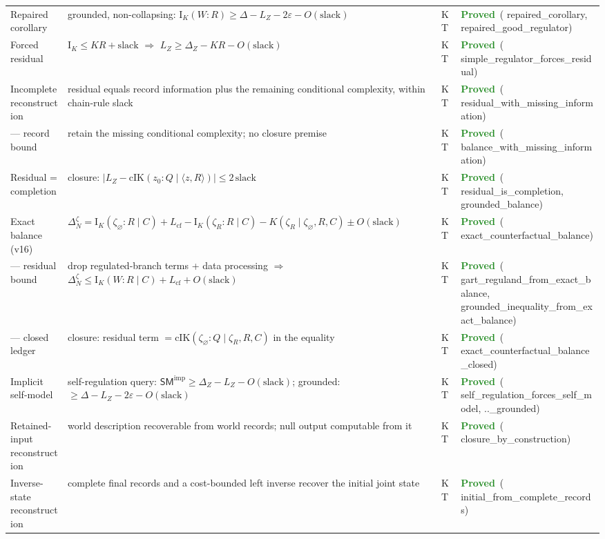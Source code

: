 \documentclass[11pt,a4paper]{article}
\newcommand{\lean}[1]{{\ttfamily\small
  \let\leanunderscore\_\def\_{\leanunderscore\allowbreak}#1}}
\newcommand{\Ik}{\mathrm{I}_K}
\newcommand{\stproved}{\textcolor{ForestGreen}{\textbf{Proved}}}
\begin{document}
{\begin{longtable}{@{}p{2.1cm}p{6.6cm}p{1.0cm}p{2.6cm}@{}}
Repaired corollary & grounded, non-collapsing: $\Ik(W{:}R)\ge\Delta-L_Z-2\varepsilon-O(\mathrm{slack})$ & KT &
  \stproved\ (\lean{repaired\_corollary}, \lean{repaired\_good\_regulator}) \\
Forced residual & $\Ik\le K R+\mathrm{slack}$ $\Rightarrow$ $L_Z\ge\Delta_Z-K R-O(\mathrm{slack})$ & KT &
  \stproved\ (\lean{simple\_regulator\_forces\_residual}) \\
Incomplete reconstruction & residual equals record information plus the remaining conditional complexity, within chain-rule slack & KT &
  \stproved\ (\lean{residual\_with\_\allowbreak missing\_information}) \\
--- record bound & retain the missing conditional complexity; no closure premise & KT &
  \stproved\ (\lean{balance\_with\_\allowbreak missing\_information}) \\
Residual = completion & closure: $|L_Z-\mathrm{cIK}(z_0{:}Q\mid\langle z,R\rangle)|\le2\,\mathrm{slack}$ & KT &
  \stproved\ (\lean{residual\_is\_completion}, \lean{grounded\_balance}) \\
Exact balance (v16) & $\Delta_N^\zeta=\Ik(\zeta_\varnothing{:}R\mid C)+L_{\mathrm{cf}}-\Ik(\zeta_R{:}R\mid C)-K(\zeta_R\mid\zeta_\varnothing,R,C)\pm O(\mathrm{slack})$ & KT &
  \stproved\ (\lean{exact\_counterfactual\_balance}) \\
--- residual bound & drop regulated-branch terms + data processing $\Rightarrow$ $\Delta_N^\zeta\le\Ik(W{:}R\mid C)+L_{\mathrm{cf}}+O(\mathrm{slack})$ & KT &
  \stproved\ (\lean{gart\_reguland\_from\_exact\_balance}, \lean{grounded\_inequality\_from\_exact\_balance}) \\
--- closed ledger & closure: residual term $=\mathrm{cIK}(\zeta_\varnothing{:}Q\mid\zeta_R,R,C)$ in the equality & KT &
  \stproved\ (\lean{exact\_counterfactual\_balance\_closed}) \\
Implicit self-model & self-regulation query: $\mathsf{SM}^{\mathrm{imp}}\ge\Delta_Z-L_Z-O(\mathrm{slack})$; grounded: $\ge\Delta-L_Z-2\varepsilon-O(\mathrm{slack})$ & KT &
  \stproved\ (\lean{self\_regulation\_forces\_self\_model}, \lean{..\_grounded}) \\
Retained-input reconstruction & world description recoverable from world records; null output computable from it & KT &
  \stproved\ (\lean{closure\_by\_construction}) \\
Inverse-state reconstruction & complete final records and a cost-bounded left inverse recover the initial joint state & KT &
  \stproved\ (\lean{initial\_from\_complete\_records}) \\

\end{longtable}}
\end{document}
